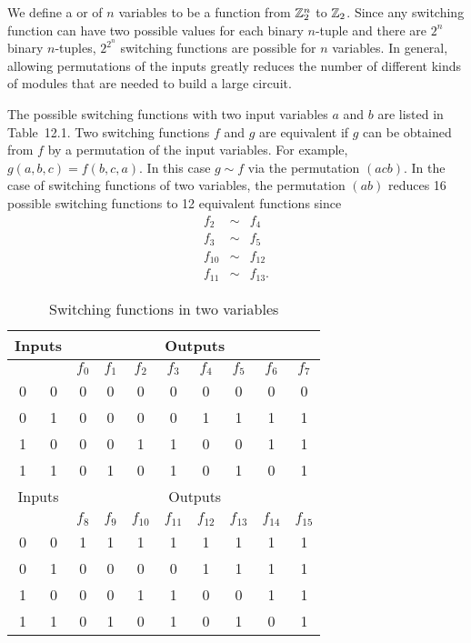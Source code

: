  
We define a  or
 of $n$
variables to be a function from ${\Bbb Z}_2^n$ to ${\Bbb Z}_2$. Since 
any switching function can have two possible values for each binary
$n$-tuple and there are $2^n$ binary $n$-tuples, $2^{2^n}$ switching
functions are possible for $n$ variables. In general, allowing
permutations of the inputs greatly reduces the number of different
kinds of modules that are needed to build a large circuit.
 
 
The possible switching functions  with two input variables $a$ and
$b$ are listed in Table~12.1. Two switching functions $f$ and $g$
are equivalent if $g$ can be obtained from $f$ by a permutation of the
input variables. For example, $g(a, b, c) = f(b, c, a)$. In this 
case $g \sim f$ via the permutation $(acb)$. In the case of switching
functions of two variables, the permutation $(ab)$ reduces 16
possible switching functions to 12 equivalent functions since
$$
\begin{array}{rcl}
f_2 & \sim & f_4 \\
f_3 & \sim & f_5 \\
f_{10} & \sim & f_{12} \\
f_{11} & \sim & f_{13}.
\end{array}
$$
 
 
\begin{table}[htb]
\caption{Switching functions in two variables}{\small
\begin{center}
\begin{tabular}{|cc|cccccccc|}
\hline
\multicolumn{2}{|c|}{Inputs}
 & \multicolumn{8}{|c|}{Outputs}    \\
\hline
         &     & $f_0$ & $f_1$ & $f_2$ & $f_3$ & $f_4$ &
$f_5$ & $f_6$ & $f_7$  \\ \hline
0 & 0   & 0 & 0 & 0 & 0 & 0 & 0 & 0 & 0 \\
0 & 1   & 0 & 0 & 0 & 0 & 1 & 1 & 1 & 1 \\
1 & 0   & 0 & 0 & 1 & 1 & 0 & 0 & 1 & 1 \\
1 & 1   & 0 & 1 & 0 & 1 & 0 & 1 & 0 & 1 \\ \hline\hline
\multicolumn{2}{|c|}{Inputs}
 & \multicolumn{8}{|c|}{Outputs}    \\
\hline
         &     & $f_8$ & $f_9$ & $f_{10}$ & $f_{11}$
& $f_{12}$ & $f_{13}$ & $f_{14}$ & $f_{15}$ \\ \hline
0 & 0   & 1 & 1 & 1 & 1 & 1 & 1 & 1 & 1 \\
0 & 1   & 0 & 0 & 0 & 0 & 1 & 1 & 1 & 1 \\
1 & 0   & 0 & 0 & 1 & 1 & 0 & 0 & 1 & 1 \\
1 & 1   & 0 & 1 & 0 & 1 & 0 & 1 & 0 & 1 \\ \hline
\end{tabular}
\end{center}
}
\end{table}
 
